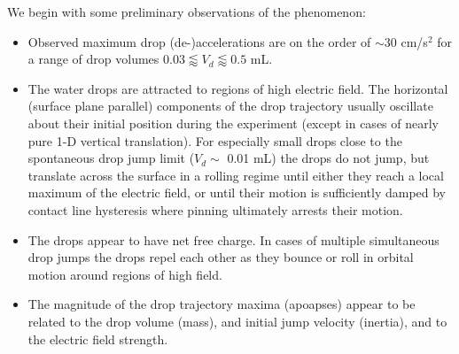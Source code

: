\documentclass[12pt,a4paper,oneside]{book}
\begin{document}
We begin with some preliminary observations of the phenomenon:
\begin{itemize}
\item Observed maximum drop (de-)accelerations are on the order of $\sim$30 cm/s$^2$ for a range of drop volumes $0.03 \lessapprox V_d \lessapprox 0.5$ mL.
\item The water drops are attracted to regions of high electric field. The horizontal (surface plane parallel) components of the drop trajectory usually oscillate about their initial position during the experiment (except in cases of nearly pure 1-D vertical translation). For especially small drops close to the spontaneous drop jump limit ($V_d \sim$ 0.01 mL) the drops do not jump, but translate across the surface in a rolling regime until either they reach a local maximum of the electric field, or until their motion is sufficiently damped by contact line hysteresis where pinning ultimately arrests their motion.
\item The drops appear to have net free charge. In cases of multiple simultaneous drop jumps the drops repel each other as they bounce or roll in orbital motion around regions of high field.
\item The magnitude of the drop trajectory maxima (apoapses) appear to be related to the drop volume (mass), and initial jump velocity (inertia), and to the electric field strength.
\end{itemize}
\end{document}
